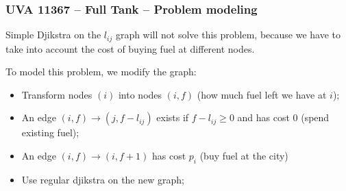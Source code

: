 \documentclass{beamer}
\begin{document}
\begin{frame}
  \frametitle{UVA 11367 -- Full Tank -- Problem modeling}
  {\smaller
    \begin{center}
    \end{center}
    
    \begin{block}{}
    Simple Djikstra on the $l_{ij}$ graph will not solve this problem,
    because we have to take into account the cost of buying fuel at
    different nodes.
    \end{block}
    
    \bigskip
    
    To model this problem, we modify the graph:
    \begin{itemize}
    \item Transform nodes $(i)$ into nodes $(i,f)$ (how much fuel left
      we have at $i$);
    \item An edge $(i,f)\rightarrow(j,f-l_{ij})$ exists if $f-l_{ij}
      \geq 0$ and has cost 0 (spend existing fuel);
    \item An edge $(i,f)\rightarrow(i,f+1)$ has cost $p_i$ (buy fuel at the city)
    \item Use regular djikstra on the new graph;
    \end{itemize}

  }
\end{frame}
\end{document}
